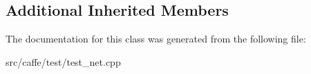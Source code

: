 \subsection*{Additional Inherited Members}


The documentation for this class was generated from the following file\+:\begin{DoxyCompactItemize}
\item 
src/caffe/test/test\+\_\+net.\+cpp\end{DoxyCompactItemize}
